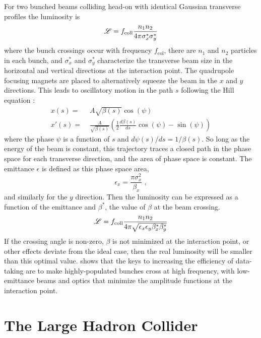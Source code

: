 For two bunched beams colliding head-on with identical Gaussian transverse profiles the luminosity is
\begin{equation}
\mathscr{L} = f_\mathrm{coll} \frac{n_1 n_2}{4 \pi \sigma_x^* \sigma_y^*}
\end{equation}
where the bunch crossings occur with frequency $f_\mathrm{col}$, there are $n_1$ and $n_2$ particles in each bunch, and $\sigma_x^*$ and $\sigma_y^*$ characterize the transverse beam size in the horizontal and vertical directions at the interaction point.
The quadrupole focusing magnets are placed to alternatively squeeze the beam in the $x$ and $y$ directions.
This leads to oscillatory motion in the path $s$ following the Hill equation \cite{Tanabashi:2018oca}:
\begin{align}
x(s) =& \; A \sqrt{\beta(s)} \cos (\psi) \\
x'(s) =& \; \frac{A}{\sqrt{\beta(s)}} \left( \frac{1}{2} \frac{d\beta(s)}{ds} \cos(\psi) - \sin(\psi) \right)
\end{align}
where the phase $\psi$ is a function of $s$ and $d\psi(s)/ds = 1/\beta(s)$.
So long as the energy of the beam is constant, this trajectory traces a closed path in the phase space for each transverse direction, and the area of phase space is constant.
The emittance $\epsilon$ is defined as this phase space area,
\begin{equation}
\epsilon_x = \frac{\pi \sigma_x^2}{\beta_x} \; ,
\end{equation}
and similarly for the $y$ direction.
Then the luminosity can be expressed as a function of the emittance and $\beta^*$, the value of $\beta$ at the beam crossing.
\begin{equation}
\label{eq:lumi}
\mathscr{L} = f_\mathrm{coll} \frac{n_1 n_2}{4 \pi \sqrt{\epsilon_x \epsilon_y \beta_x^* \beta_y^*}}
\end{equation}
If the crossing angle is non-zero, $\beta$ is not minimized at the interaction point, or other effects deviate from the ideal case, then the real luminosity will be smaller than this optimal value.
 shows that the keys to increasing the efficiency of data-taking are to make highly-populated bunches cross at high frequency, with low-emittance beams and optics that minimize the amplitude functions at the interaction point.

\section{The Large Hadron Collider}

